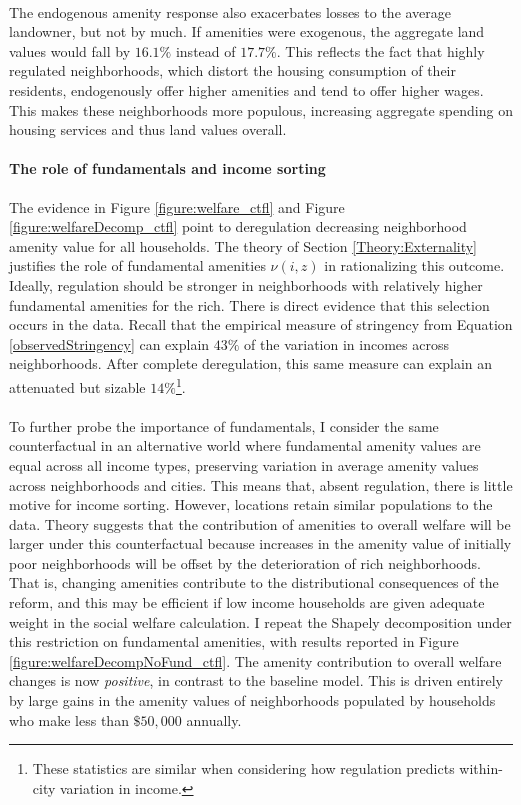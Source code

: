\documentclass[12pt]{article}
\begin{document}
\paragraph*{}
The endogenous amenity response also exacerbates losses to the average landowner, but not by much. If amenities were exogenous, the aggregate land values would fall by $16.1 \%$ instead of $17.7 \%$. This reflects the fact that highly regulated neighborhoods, which distort the housing consumption of their residents, endogenously offer higher amenities and tend to offer higher wages. This makes these neighborhoods more populous, increasing aggregate spending on housing services and thus land values overall. 

\paragraph*{The role of fundamentals and income sorting} The evidence in Figure \ref{figure:welfare_ctfl} and Figure \ref{figure:welfareDecomp_ctfl} point to deregulation decreasing neighborhood amenity value for all households. The theory of Section \ref{Theory:Externality} justifies the role of fundamental amenities $\nu(i, z)$ in rationalizing this outcome. Ideally, regulation should be stronger in neighborhoods with relatively higher fundamental amenities for the rich. There is direct evidence that this selection occurs in the data. Recall that the empirical measure of stringency from Equation \eqref{observedStringency} can explain $43 \%$ of the variation in incomes across neighborhoods. After complete deregulation, this same measure can explain an attenuated but sizable $14 \%$\footnote{These statistics are similar when considering how regulation predicts within-city variation in income.}.   

\paragraph*{}
To further probe the importance of fundamentals, I consider the same counterfactual in an alternative world where fundamental amenity values are equal across all income types, preserving variation in average amenity values across neighborhoods and cities. This means that, absent regulation, there is little motive for income sorting. However, locations retain similar populations to the data. Theory suggests that the contribution of amenities to overall welfare will be larger under this counterfactual because increases in the amenity value of initially poor neighborhoods will be offset by the deterioration of rich neighborhoods. That is, changing amenities contribute to the distributional consequences of the reform, and this may be efficient if low income households are given adequate weight in the social welfare calculation. I repeat the Shapely decomposition under this restriction on fundamental amenities, with results reported in Figure \ref{figure:welfareDecompNoFund_ctfl}. The amenity contribution to overall welfare changes is now \textit{positive}, in contrast to the baseline model. This is driven entirely by large gains in the amenity values of neighborhoods populated by households who make less than $\$50,000$ annually. 
\end{document}

